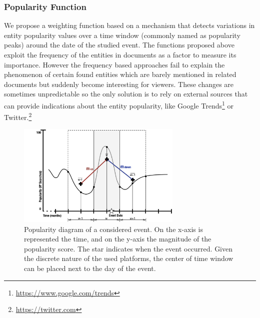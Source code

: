 \documentclass{llncs}
\begin{document}
\subsubsection{Popularity Function}
We propose a weighting function based on a mechanism that detects variations in entity popularity values over a time window (commonly named as popularity peaks) around the date of the studied event. The functions proposed above exploit the frequency of the entities in documents as a factor to measure its importance. However the frequency based approaches fail to explain the phenomenon of certain found entities which are barely mentioned in related documents but suddenly become interesting for viewers. These changes are sometimes unpredictable so the only solution is to rely on external sources that can provide indications about the entity popularity, like Google Trends\footnote{\url{https://www.google.com/trends}} or Twitter.\footnote{\url{https://twitter.com}}
\begin{figure}[h!]
\centering
\includegraphics[width=0.7\textwidth]{figure/PopularityMeasure}
\caption{Popularity diagram of a considered event. On the x-axis is represented the time, and on the y-axis the magnitude of the popularity score. The star indicates when the event occurred. Given the discrete nature of the used platforms, the center of time window can be placed next to the day of the event.}
\label{fig:PopularityMeasure}%
\end{figure}
\end{document}
